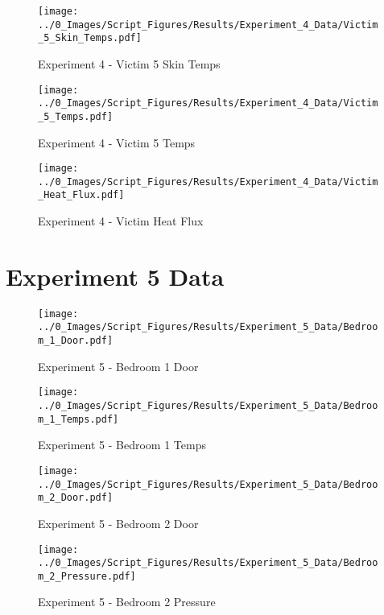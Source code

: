 	\clearpage

	\begin{figure}[H]
		\centering
		\texttt{[image: ../0\_Images/Script\_Figures/Results/Experiment\_4\_Data/Victim\_5\_Skin\_Temps.pdf]}
		\caption[]{Experiment 4 - Victim 5 Skin Temps}
	\end{figure}
 

	\begin{figure}[H]
		\centering
		\texttt{[image: ../0\_Images/Script\_Figures/Results/Experiment\_4\_Data/Victim\_5\_Temps.pdf]}
		\caption[]{Experiment 4 - Victim 5 Temps}
	\end{figure}
 
	\clearpage

	\begin{figure}[H]
		\centering
		\texttt{[image: ../0\_Images/Script\_Figures/Results/Experiment\_4\_Data/Victim\_Heat\_Flux.pdf]}
		\caption[]{Experiment 4 - Victim Heat Flux}
	\end{figure}
 

\clearpage		\large
\section{Experiment 5 Data} \label{App:Exp5Results} 

	\begin{figure}[H]
		\centering
		\texttt{[image: ../0\_Images/Script\_Figures/Results/Experiment\_5\_Data/Bedroom\_1\_Door.pdf]}
		\caption[]{Experiment 5 - Bedroom 1 Door}
	\end{figure}
 

	\begin{figure}[H]
		\centering
		\texttt{[image: ../0\_Images/Script\_Figures/Results/Experiment\_5\_Data/Bedroom\_1\_Temps.pdf]}
		\caption[]{Experiment 5 - Bedroom 1 Temps}
	\end{figure}
 
	\clearpage

	\begin{figure}[H]
		\centering
		\texttt{[image: ../0\_Images/Script\_Figures/Results/Experiment\_5\_Data/Bedroom\_2\_Door.pdf]}
		\caption[]{Experiment 5 - Bedroom 2 Door}
	\end{figure}
 

	\begin{figure}[H]
		\centering
		\texttt{[image: ../0\_Images/Script\_Figures/Results/Experiment\_5\_Data/Bedroom\_2\_Pressure.pdf]}
		\caption[]{Experiment 5 - Bedroom 2 Pressure}
	\end{figure}
 
